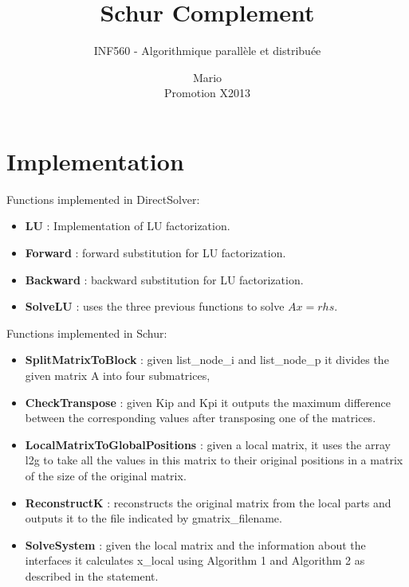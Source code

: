 \documentclass[a4paper,12pt,oneside]{article}
\title{Schur Complement}
\subtitle{INF560 - Algorithmique parallèle et distribuée}
\author{Mario \bsc{Ynocente Castro} \\ Promotion X2013}
\begin{document}
\maketitle

\section{Implementation}

Functions implemented in DirectSolver:
\\
\begin{itemize}
\item
\textbf{LU} : Implementation of LU factorization.
\\
\item
\textbf{Forward} : forward substitution for LU factorization.
\\
\item
\textbf{Backward} : backward substitution for LU factorization.
\\
\item
\textbf{SolveLU} : uses the three previous functions to solve $Ax = rhs$.
\\
\end{itemize}

Functions implemented in Schur:
\\
\begin{itemize}
\item
\textbf{SplitMatrixToBlock} : given list{\_}node{\_}i and list{\_}node{\_}p it divides the given matrix A into four submatrices,
\\
\item
\textbf{CheckTranspose} : given Kip and Kpi it outputs the maximum difference between the corresponding values after transposing one of the matrices.
\\
\item
\textbf{LocalMatrixToGlobalPositions} : given a local matrix, it uses the array l2g to take all the values in this matrix to their original positions in a matrix
of the size of the original matrix.
\\
\item
\textbf{ReconstructK} : reconstructs the original matrix from the local parts and outputs it to the file indicated by gmatrix{\_}filename.
\\
\item
\textbf{SolveSystem} : given the local matrix and the information about the interfaces it calculates x{\_}local using Algorithm 1 and Algorithm 2
as described in the statement.
\end{itemize}
\end{document}
